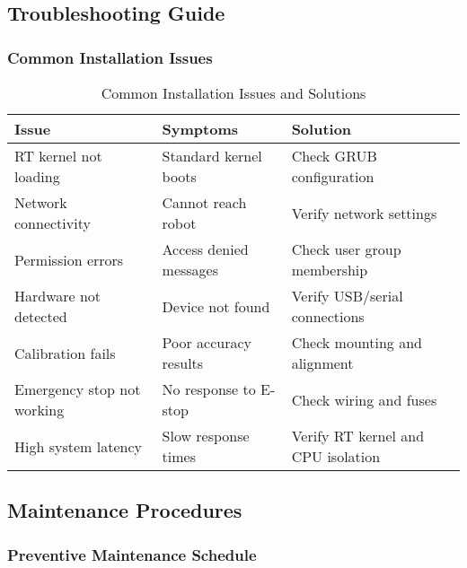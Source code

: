 \subsection{Troubleshooting Guide}

\subsubsection{Common Installation Issues}

\begin{table}[htbp]
\centering
\caption{Common Installation Issues and Solutions}
\label{tab:app-troubleshooting}
\begin{tabular}{|l|l|l|}
\hline
\textbf{Issue} & \textbf{Symptoms} & \textbf{Solution} \\
\hline
RT kernel not loading & Standard kernel boots & Check GRUB configuration \\
Network connectivity & Cannot reach robot & Verify network settings \\
Permission errors & Access denied messages & Check user group membership \\
Hardware not detected & Device not found & Verify USB/serial connections \\
Calibration fails & Poor accuracy results & Check mounting and alignment \\
Emergency stop not working & No response to E-stop & Check wiring and fuses \\
High system latency & Slow response times & Verify RT kernel and CPU isolation \\
\hline
\end{tabular}
\end{table}

\subsection{Maintenance Procedures}

\subsubsection{Preventive Maintenance Schedule}

